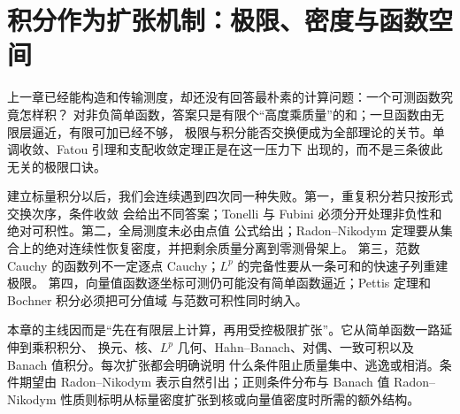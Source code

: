 \chapter{积分作为扩张机制：极限、密度与函数空间}\label{ch:03}

上一章已经能构造和传输测度，却还没有回答最朴素的计算问题：一个可测函数究竟怎样积？
对非负简单函数，答案只是有限个“高度乘质量”的和；一旦函数由无限层逼近，有限可加已经不够，
极限与积分能否交换便成为全部理论的关节。单调收敛、Fatou 引理和支配收敛定理正是在这一压力下
出现的，而不是三条彼此无关的极限口诀。

建立标量积分以后，我们会连续遇到四次同一种失败。第一，重复积分若只按形式交换次序，条件收敛
会给出不同答案；Tonelli 与 Fubini 必须分开处理非负性和绝对可积性。第二，全局测度未必由点值
公式给出；Radon--Nikodym 定理要从集合上的绝对连续性恢复密度，并把剩余质量分离到零测骨架上。
第三，范数 Cauchy 的函数列不一定逐点 Cauchy；$L^p$ 的完备性要从一条可和的快速子列重建极限。
第四，向量值函数逐坐标可测仍可能没有简单函数逼近；Pettis 定理和 Bochner 积分必须把可分值域
与范数可积性同时纳入。

本章的主线因而是“先在有限层上计算，再用受控极限扩张”。它从简单函数一路延伸到乘积积分、
换元、核、$L^p$ 几何、Hahn--Banach、对偶、一致可积以及 Banach 值积分。每次扩张都会明确说明
什么条件阻止质量集中、逃逸或相消。条件期望由 Radon--Nikodym 表示自然引出；正则条件分布与
Banach 值 Radon--Nikodym 性质则标明从标量密度扩张到核或向量值密度时所需的额外结构。





